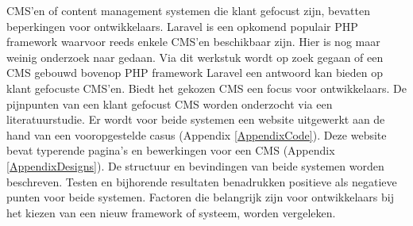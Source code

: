 CMS'en of content management systemen die klant gefocust zijn, bevatten beperkingen voor ontwikkelaars. Laravel is een opkomend populair PHP framework waarvoor reeds enkele CMS'en beschikbaar zijn. Hier is nog maar weinig onderzoek naar gedaan. Via dit werkstuk wordt op zoek gegaan of een CMS gebouwd bovenop PHP framework Laravel een antwoord kan bieden op klant gefocuste CMS'en. Biedt het gekozen CMS een focus voor ontwikkelaars.
\newline\newline
De pijnpunten van een klant gefocust CMS worden onderzocht via een literatuurstudie. Er wordt voor beide systemen een website uitgewerkt aan de hand van een vooropgestelde casus (Appendix \ref{AppendixCode}). Deze website bevat typerende pagina's en bewerkingen voor een CMS (Appendix \ref{AppendixDesigns}). De structuur en bevindingen van beide systemen worden beschreven.
\newline\newline
Testen en bijhorende resultaten benadrukken positieve als negatieve punten voor beide systemen. Factoren die belangrijk zijn voor ontwikkelaars bij het kiezen van een nieuw framework of systeem, worden vergeleken.
